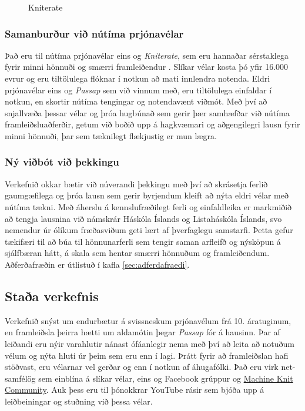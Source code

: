 \documentclass[a4paper,12pt,twoside]{article}
\begin{document}
\begin{figure}[H]
\begin{minipage}[b]{0.45\linewidth}
        \caption{Kniterate}
        \label{fig:kniterate}
    \end{minipage}
\end{figure}



\subsubsection{Samanburður við nútíma prjónavélar}
Það eru til nútíma prjónavélar eins og \emph{Kniterate}, sem eru hannaðar sérstaklega fyrir minni hönnuði og smærri framleiðendur \cite{kniterate}. Slíkar vélar kosta þó yfir 16.000 evrur og eru tiltölulega flóknar í notkun að mati innlendra notenda. Eldri prjónavélar eins og \textit{Passap} sem við vinnum með, eru tiltölulega einfaldar í notkun, en skortir nútíma tengingar og notendavænt viðmót. Með því að snjallvæða þessar vélar og þróa hugbúnað sem gerir þær samhæfðar við nútíma framleiðsluaðferðir, getum við boðið upp á hagkvæmari og aðgengilegri lausn fyrir minni hönnuði, þar sem tæknilegt flækjustig er mun lægra.

\subsubsection{Ný viðbót við þekkingu}
Verkefnið okkar bætir við núverandi þekkingu með því að skrásetja ferlið gaumgæfilega og þróa lausn sem gerir byrjendum kleift að nýta eldri vélar með nútíma tækni. Með áherslu á kennslufræðilegt ferli og einfaldleika er markmiðið að tengja lausnina við námskrár Háskóla Íslands og Listaháskóla Íslands, svo nemendur úr ólíkum fræðasviðum geti lært af þverfaglegu samstarfi. Þetta gefur tækifæri til að búa til hönnunarferli sem tengir saman arfleifð og nýsköpun á sjálfbæran hátt, á skala sem hentar smærri hönnuðum og framleiðendum. Aðferðafræðin er útlistuð í kafla \ref{sec:adferdafraedi}.

\subsection{Staða verkefnis}
Verkefnið snýst um endurbætur á svissneskum prjónavélum frá 10. áratuginum, en framleiðsla þeirra hætti um aldamótin þegar \textit{Passap} fór á hausinn. Þar af leiðandi eru nýir varahlutir nánast ófáanlegir nema með því að leita að notuðum vélum og nýta hluti úr þeim sem eru enn í lagi. Þrátt fyrir að framleiðslan hafi stöðvast, eru vélarnar vel gerðar og enn í notkun af áhugafólki. Það eru virk net-samfélög sem einblína á slíkar vélar, eins og Facebook grúppur og \href{https://www.mkc.community/}{Machine Knit Community}. Auk þess eru til þónokkrar YouTube rásir sem bjóða upp á leiðbeiningar og stuðning við þessa vélar.
\end{document}
